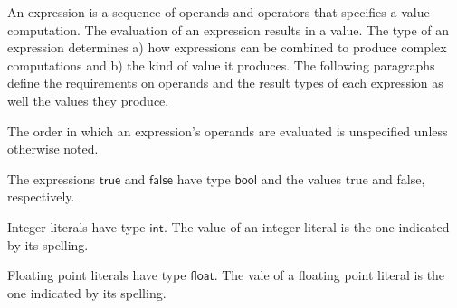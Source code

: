 \documentclass[11pt]{article}
\newcommand{\mathsc}[1]{\bm{\mathsf{#1}}}
\newcommand{\typebool}{\ensuremath{\mathsc{bool}}\xspace}
\newcommand{\typeint}{\ensuremath{\mathsc{int}}\xspace}
\newcommand{\typefloat}{\ensuremath{\mathsc{float}}\xspace}
\newcommand{\exprtrue}{\mathsc{true}}
\newcommand{\exprfalse}{\mathsc{false}}
\newcommand{\exprand}[2]{#1 \mathbin{\mathsc{and}} #2}
\newcommand{\expror}[2]{#1 \mathbin{\mathsc{or}} #2}
\newcommand{\exprxor}[2]{#1 \mathbin{\mathsc{xor}} #2}
\newcommand{\exprnot}[1]{\mathsc{not}\;#1}
\newcommand{\exprif}[3]{\mathsc{if}\;#1\;\mathsc{then}\;#2\;\mathsc{else}\;#3}
\newcommand{\expreq}[2]{#1 = #2}
\newcommand{\exprne}[2]{#1 \neq #2}
\begin{document}
An expression is a sequence of operands and operators that specifies a value
computation. The evaluation of an expression results in a value. The type of an 
expression determines a) how expressions can be combined to produce complex 
computations and b) the kind of value it produces. The following paragraphs define
the requirements on operands and the result types of each expression as well 
the values they produce.

The order in which an expression's operands are evaluated is unspecified unless 
otherwise noted.

The expressions $\exprtrue$ and $\exprfalse$ have type $\typebool$ and the
values true and false, respectively.

Integer literals have type $\typeint$. The value of an integer literal is the
one indicated by its spelling.

Floating point literals have type \typefloat. The vale of a floating point
literal is the one indicated by its spelling.




\end{document}

